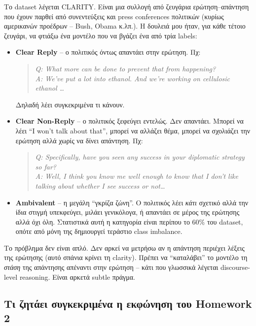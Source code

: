 \documentclass[12pt]{fphw}
\begin{document}
Το dataset λέγεται CLARITY. Είναι μια συλλογή από ζευγάρια ερώτηση--απάντηση που έχουν παρθεί από συνεντεύξεις και press conferences πολιτικών (κυρίως αμερικανών προέδρων -- Bush, Obama κ.λπ.). Η δουλειά μου ήταν, για κάθε τέτοιο ζευγάρι, να φτιάξω ένα μοντέλο που να βγάζει ένα από τρία labels:

\begin{itemize}
    \item \textbf{Clear Reply} -- ο πολιτικός όντως απαντάει στην ερώτηση. Πχ:
    \begin{quote}
    \emph{Q: What more can be done to prevent that from happening?} \\
    \emph{A: We've put a lot into ethanol. And we're working on cellulosic ethanol \dots}
    \end{quote}
    Δηλαδή λέει συγκεκριμένα τι κάνουν.

    \item \textbf{Clear Non-Reply} -- ο πολιτικός ξεφεύγει εντελώς. Δεν απαντάει. Μπορεί να λέει ``I won't talk about that'', μπορεί να αλλάζει θέμα, μπορεί να σχολιάζει την ερώτηση αλλά χωρίς να δίνει απάντηση. Πχ:
    \begin{quote}
    \emph{Q: Specifically, have you seen any success in your diplomatic strategy so far?} \\
    \emph{A: Well, I think you know me well enough to know that I don't like talking about whether I see success or not\dots}
    \end{quote}

    \item \textbf{Ambivalent} -- η μεγάλη ``γκρίζα ζώνη''. Ο πολιτικός λέει \emph{κάτι} σχετικό αλλά την ίδια στιγμή υπεκφεύγει, μιλάει γενικόλογα, ή απαντάει σε μέρος της ερώτησης αλλά όχι όλη. Στατιστικά αυτή η κατηγορία είναι περίπου το 60\% του dataset, οπότε από μόνη της δημιουργεί τεράστιο class imbalance.
\end{itemize}

Το πρόβλημα δεν είναι απλό. Δεν αρκεί να μετρήσω αν η απάντηση περιέχει λέξεις της ερώτησης (αυτό σπάνια κρίνει τη clarity). Πρέπει να ``καταλάβει'' το μοντέλο τη \emph{στάση} της απάντησης απέναντι στην ερώτηση -- κάτι που γλωσσικά λέγεται discourse-level reasoning. Είναι αρκετά subtle πράγμα.

\subsection{Τι ζητάει συγκεκριμένα η εκφώνηση του Homework 2}
\end{document}
